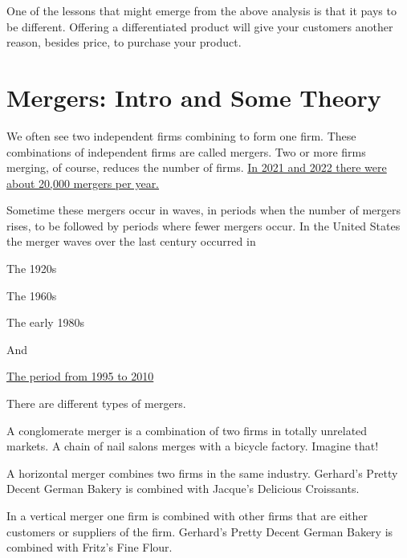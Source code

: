 \documentclass[
]{book}
\begin{document}
One of the lessons that might emerge from the above analysis is that it pays to be different. Offering a differentiated product will give your customers another reason, besides price, to purchase your product.

\hypertarget{mergers-intro-and-some-theory}{%
\section{Mergers: Intro and Some Theory}\label{mergers-intro-and-some-theory}}

We often see two independent firms combining to form one firm. These combinations of independent firms are called mergers. Two or more firms merging, of course, reduces the number of firms. \href{https://www.statista.com/statistics/245977/number-of-munda-deals-in-the-united-states/\#:~:text=The\%20overall\%20number\%20of\%20M\%26A,23\%2C161\%20in\%20the\%20previous\%20year.\&text=Merger\%20and\%20acquisition\%20(M\%26A)\%20refers,the\%20consolidation\%20of\%20two\%20companies}{In 2021 and 2022 there were about 20,000 mergers per year.}

Sometime these mergers occur in waves, in periods when the number of mergers rises, to be followed by periods where fewer mergers occur. In the United States the merger waves over the last century occurred in

\begin{center}
The 1920s

The 1960s

The early 1980s

And

\href{https://amsa-network.com/amsanews/search/2019/1/17/market-basics-merger-waves}{The period from 1995 to 2010}

\end{center}

There are different types of mergers.

A conglomerate merger is a combination of two firms in totally unrelated markets. A chain of nail salons merges with a bicycle factory. Imagine that!

A horizontal merger combines two firms in the same industry. Gerhard's Pretty Decent German Bakery is combined with Jacque's Delicious Croissants.

In a vertical merger one firm is combined with other firms that are either customers or suppliers of the firm. Gerhard's Pretty Decent German Bakery is combined with Fritz's Fine Flour.
\end{document}
